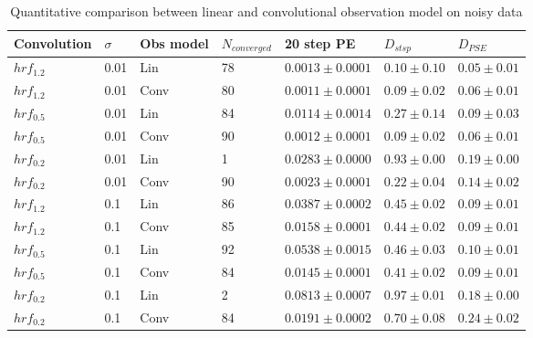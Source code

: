\begin{table}
\caption{Quantitative comparison between linear and convolutional observation model on noisy data}
\label{tab:noisy_comp_table}
\begin{tabular}{lllllll}
\toprule
Convolution & $\sigma$ & Obs model & $N_{converged}$ & 20 step PE & $D_{stsp}$ & $D_{PSE}$ \\
\midrule
$hrf_{1.2}$ & 0.01 & Lin & 78 & $0.0013 \pm 0.0001$ & $0.10 \pm 0.10$ & $0.05 \pm 0.01$ \\
$hrf_{1.2}$ & 0.01 & Conv & 80 & $0.0011 \pm 0.0001$ & $0.09 \pm 0.02$ & $0.06 \pm 0.01$ \\
$hrf_{0.5}$ & 0.01 & Lin & 84 & $0.0114 \pm 0.0014$ & $0.27 \pm 0.14$ & $0.09 \pm 0.03$ \\
$hrf_{0.5}$ & 0.01 & Conv & 90 & $0.0012 \pm 0.0001$ & $0.09 \pm 0.02$ & $0.06 \pm 0.01$ \\
$hrf_{0.2}$ & 0.01 & Lin & 1 & $0.0283 \pm 0.0000$ & $0.93 \pm 0.00$ & $0.19 \pm 0.00$ \\
$hrf_{0.2}$ & 0.01 & Conv & 90 & $0.0023 \pm 0.0001$ & $0.22 \pm 0.04$ & $0.14 \pm 0.02$ \\
$hrf_{1.2}$ & 0.1 & Lin & 86 & $0.0387 \pm 0.0002$ & $0.45 \pm 0.02$ & $0.09 \pm 0.01$ \\
$hrf_{1.2}$ & 0.1 & Conv & 85 & $0.0158 \pm 0.0001$ & $0.44 \pm 0.02$ & $0.09 \pm 0.01$ \\
$hrf_{0.5}$ & 0.1 & Lin & 92 & $0.0538 \pm 0.0015$ & $0.46 \pm 0.03$ & $0.10 \pm 0.01$ \\
$hrf_{0.5}$ & 0.1 & Conv & 84 & $0.0145 \pm 0.0001$ & $0.41 \pm 0.02$ & $0.09 \pm 0.01$ \\
$hrf_{0.2}$ & 0.1 & Lin & 2 & $0.0813 \pm 0.0007$ & $0.97 \pm 0.01$ & $0.18 \pm 0.00$ \\
$hrf_{0.2}$ & 0.1 & Conv & 84 & $0.0191 \pm 0.0002$ & $0.70 \pm 0.08$ & $0.24 \pm 0.02$ \\
\bottomrule
\end{tabular}
\end{table}
